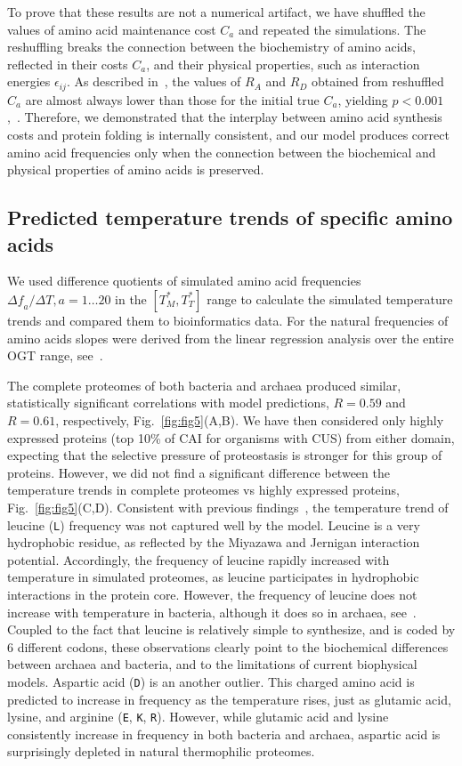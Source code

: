 \documentclass[10pt,letterpaper]{article}
\begin{document}
To prove that these results are not a numerical artifact, we have shuffled the values of amino acid maintenance cost $C_a$ and repeated the simulations. The reshuffling breaks the connection between the biochemistry of amino acids, reflected in their costs $C_a$, and their physical properties, such as interaction energies $\epsilon_{ij}$. As described in~, the values of $R_A$ and $R_D$ obtained from reshuffled $C_a$ are almost always lower than those for the initial true $C_a$, yielding $p<0.001$,~. Therefore, we demonstrated that the interplay between amino acid synthesis costs and protein folding is internally consistent, and our model produces correct amino acid frequencies only when the connection between the biochemical and physical properties of amino acids is preserved.

 
\subsection*{Predicted temperature trends of specific amino acids}
    
We used difference quotients of simulated amino acid frequencies $\Delta\mathit{f}_{a}/\Delta T, a=1\dots20$ in the $[T^*_M,T^*_T]$ range to calculate the simulated temperature trends and compared them to bioinformatics data. For the natural frequencies of amino acids slopes were derived from the linear regression analysis over the entire OGT range, see~.

The complete proteomes of both bacteria and archaea produced similar, statistically significant correlations with model predictions, $R=0.59$ and $R=0.61$, respectively, Fig.~\ref{fig:fig5}(A,B). We have then considered only highly expressed proteins (top 10\% of CAI for organisms with CUS) from either domain, expecting that the selective pressure of proteostasis is stronger for this group of proteins. However, we did not find a significant difference between the temperature trends in complete proteomes vs highly expressed proteins, Fig.~\ref{fig:fig5}(C,D). Consistent with previous findings~\cite{Venev2015Massively}, the temperature trend of leucine (\texttt{L}) frequency was not captured well by the model. Leucine is a very hydrophobic residue, as reflected by the Miyazawa and Jernigan interaction potential. Accordingly, the frequency of leucine rapidly increased with temperature in simulated proteomes, as leucine participates in hydrophobic interactions in the protein core. However, the frequency of leucine does not increase with temperature in bacteria, although it does so in archaea, see~. Coupled to the fact that leucine is relatively simple to synthesize, and is coded by 6 different codons, these observations clearly point to the biochemical differences between archaea and bacteria, and to the limitations of current biophysical models. Aspartic acid (\texttt{D}) is an another outlier. This charged amino acid is predicted to increase in frequency as the temperature rises, just as glutamic acid, lysine, and arginine (\texttt{E}, \texttt{K}, \texttt{R}). However, while glutamic acid and lysine consistently increase in frequency in both bacteria and archaea, aspartic acid is surprisingly depleted in natural thermophilic proteomes.
\end{document}
